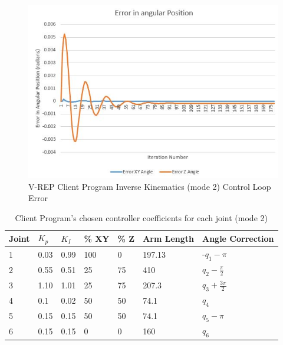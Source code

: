 \documentclass[12pt,openany,a4paper]{book}
\begin{document}
\vspace{\baselineskip}

\begin{center}
\begin{figure}[htb]
  \includegraphics[width=1\linewidth]{control_loop_error_best.jpg}
\caption{V-REP Client Program Inverse Kinematics (mode 2) Control Loop Error}
\end{figure}
\end{center}

\vspace{\baselineskip}

\begin{center}
\begin{table}[htb]

\begin{tabular}{| p{1.2cm} | p{2cm} | p{2cm} | p{2cm} | p{2cm} | p{2cm} | p{2cm} |}
    \hline
    Joint & $K_p$ & $K_I$ & \% XY & \% Z & Arm Length & Angle Correction \\ \hline
     1 & 0.03	& 0.99	& 100	& 0		& 197.13 &	-$q_1 - \pi$ \\ \hline
     2 & 0.55	& 0.51	& 25	& 75	& 410 	&	$q_2 - \frac{\pi}{2}$  \\ \hline
     3 & 1.10	& 1.01	& 25	& 75	& 207.3 &	$q_3 + \frac{3 \pi}{2}$ \\ \hline
     4 & 0.1	& 0.02	& 50	& 50	& 74.1	& $q_4$ \\ \hline
     5 & 0.15	& 0.15	& 50	& 50 	& 74.1	& $q_5 - \pi$ \\ \hline
     6 & 0.15	& 0.15	& 0		& 0 	& 160 	& $q_6$ \\ \hline
    \end{tabular}
    \caption{Client Program's chosen controller coefficients for each joint (mode 2)}
\end{table}
\end{center}
\end{document}
